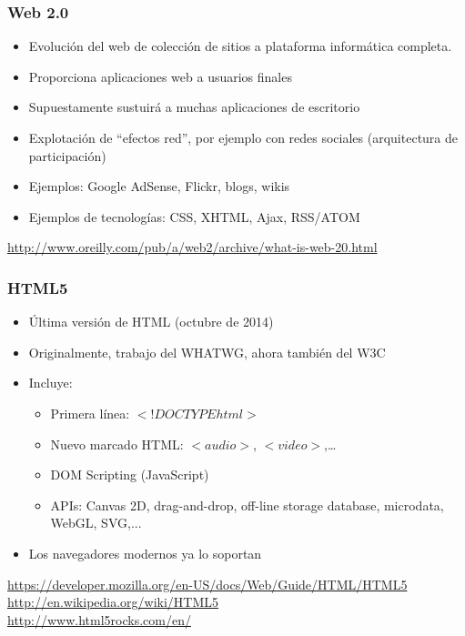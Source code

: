
\begin{frame}
\frametitle{Web 2.0}

\begin{itemize}
\item Evolución del web de colección de sitios a plataforma
  informática completa.
\item Proporciona aplicaciones web a usuarios finales
\item Supuestamente sustuirá a muchas aplicaciones de escritorio
\item Explotación de ``efectos red'', por ejemplo con redes sociales
  (arquitectura de participación)
\item Ejemplos: Google AdSense, Flickr, blogs, wikis
\item Ejemplos de tecnologías: CSS, XHTML, Ajax, RSS/ATOM
\end{itemize}

\begin{flushright}
{\small
\url{http://www.oreilly.com/pub/a/web2/archive/what-is-web-20.html}
}
\end{flushright}

\end{frame}


\begin{frame}
\frametitle{HTML5}

\begin{itemize}
  \item Última versión de HTML (octubre de 2014)
  \item Originalmente, trabajo del WHATWG, ahora también del W3C
  \item Incluye:
  \begin{itemize}
    \item Primera línea: $<!DOCTYPE html>$
    \item Nuevo marcado HTML: $<audio>$, $<video>$,\ldots
    \item DOM Scripting (JavaScript)
    \item APIs: Canvas 2D, drag-and-drop, off-line storage database, microdata, WebGL, SVG,...
  \end{itemize}
  \item Los navegadores modernos ya lo soportan
\end{itemize}

{\small
\begin{flushright}
  \url{https://developer.mozilla.org/en-US/docs/Web/Guide/HTML/HTML5} \\
  \url{http://en.wikipedia.org/wiki/HTML5} \\
  \url{http://www.html5rocks.com/en/} \\
\end{flushright}
}
\end{frame}


